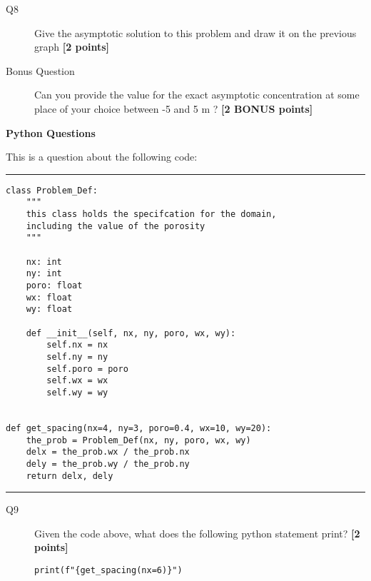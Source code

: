 \documentclass{article}
\begin{document}

\begin{description}
\item [Q8] Give the asymptotic solution to this problem and draw it on the previous graph  \textbf{[2 points]}

\item[Bonus Question] Can you provide the value for the exact asymptotic concentration at some place of your choice between -5 and 5 m ? \textbf{[2 BONUS points]}
\vspace{2cm}

\end{description}


\newpage
\textbf{Python Questions}


This is a question about the following code:

\rule{15cm}{0.75pt}


\begin{verbatim}
class Problem_Def:
    """
    this class holds the specifcation for the domain,
    including the value of the porosity
    """

    nx: int
    ny: int
    poro: float
    wx: float
    wy: float

    def __init__(self, nx, ny, poro, wx, wy):
        self.nx = nx
        self.ny = ny
        self.poro = poro
        self.wx = wx
        self.wy = wy


def get_spacing(nx=4, ny=3, poro=0.4, wx=10, wy=20):
    the_prob = Problem_Def(nx, ny, poro, wx, wy)
    delx = the_prob.wx / the_prob.nx
    dely = the_prob.wy / the_prob.ny
    return delx, dely
\end{verbatim}

\rule{15cm}{0.75pt}

\begin{description}

\item[Q9] Given the code above, what does the following python statement print?
  \textbf{[2 points]}
  
\verb+print(f"{get_spacing(nx=6)}")+

  
\end{description}
\end{document}
